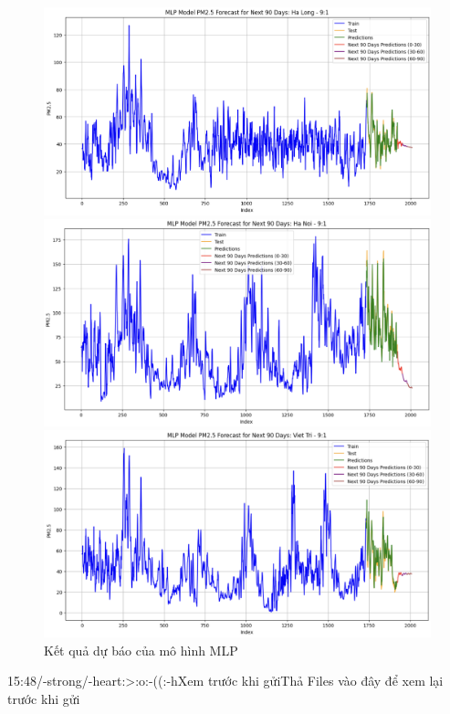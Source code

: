 \begin{figure}[H]
    \begin{minipage}{0.15\textwidth}
        \centering
        \includegraphics[width=1\textwidth]{img/final/MLP/90D/MLP_9_1_HL.png}
        \end{minipage}
        \hfill
        \begin{minipage}{0.15\textwidth}
        \centering
        \includegraphics[width=1\textwidth]{img/final/MLP/90D/MLP_9_1_HN.png}
        \end{minipage}
        \hfill
        \begin{minipage}{0.15\textwidth}
        \centering
        \includegraphics[width=1\textwidth]{img/final/MLP/90D/MLP_9_1_VT.png}
        \end{minipage}
        \hfill
    
    \caption{Kết quả dự báo của mô hình MLP}
    \label{fig:MLP}
    
\end{figure}15:48/-strong/-heart:>:o:-((:-hXem trước khi gửiThả Files vào đây để xem lại trước khi gửi